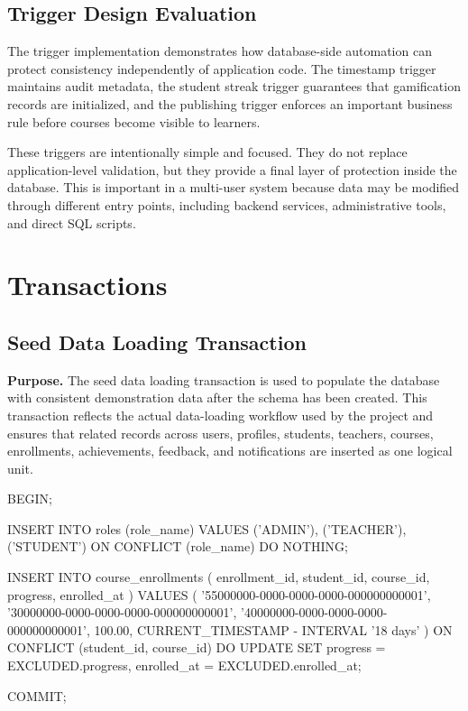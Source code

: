 \subsection{Trigger Design Evaluation}

The trigger implementation demonstrates how database-side automation can protect consistency independently of application code. The timestamp trigger maintains audit metadata, the student streak trigger guarantees that gamification records are initialized, and the publishing trigger enforces an important business rule before courses become visible to learners.

These triggers are intentionally simple and focused. They do not replace application-level validation, but they provide a final layer of protection inside the database. This is important in a multi-user system because data may be modified through different entry points, including backend services, administrative tools, and direct SQL scripts.

\section{Transactions}
\subsection{Seed Data Loading Transaction}

\textbf{Purpose.} The seed data loading transaction is used to populate the database with consistent demonstration data after the schema has been created. This transaction reflects the actual data-loading workflow used by the project and ensures that related records across users, profiles, students, teachers, courses, enrollments, achievements, feedback, and notifications are inserted as one logical unit.

\begin{sqlcode}[caption={Transaction wrapper used by the seed data script},label={lst:transaction-seed-data-wrapper}]
BEGIN;

INSERT INTO roles (role_name)
VALUES ('ADMIN'), ('TEACHER'), ('STUDENT')
ON CONFLICT (role_name) DO NOTHING;

INSERT INTO course_enrollments (
    enrollment_id,
    student_id,
    course_id,
    progress,
    enrolled_at
)
VALUES (
    '55000000-0000-0000-0000-000000000001',
    '30000000-0000-0000-0000-000000000001',
    '40000000-0000-0000-0000-000000000001',
    100.00,
    CURRENT_TIMESTAMP - INTERVAL '18 days'
)
ON CONFLICT (student_id, course_id) DO UPDATE
SET progress = EXCLUDED.progress,
    enrolled_at = EXCLUDED.enrolled_at;

COMMIT;
\end{sqlcode}

